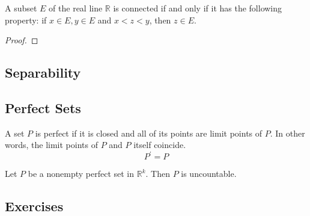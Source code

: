   \begin{theorem}
  A subset $E$ of the real line $\mathbb{R}$ is connected if and only if it has the following property: if $x \in E, y \in E$ and $x < z < y$, then $z \in E$. 
  \end{theorem}
  \begin{proof}

  \end{proof}

\subsection{Separability}

\subsection{Perfect Sets}

  \begin{definition}
    A set $P$ is perfect if it is closed and all of its points are limit points of $P$. In other words, the limit points of $P$ and $P$ itself coincide. 
    \begin{equation}
      P^\prime = P
    \end{equation}
  \end{definition}

  \begin{theorem}
    Let $P$ be a nonempty perfect set in $\mathbb{R}^k$. Then $P$ is uncountable. 
  \end{theorem}

\subsection{Exercises}

